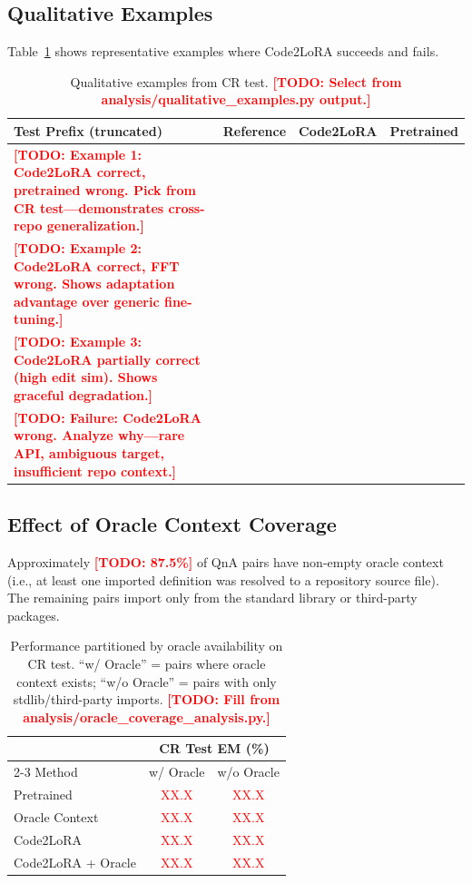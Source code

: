 \documentclass[11pt]{article}
\newcommand{\method}{Code2LoRA}
\newcommand{\todo}[1]{\textcolor{red}{\textbf{[TODO: #1]}}}
\newcommand{\todoinline}[1]{\textcolor{red}{#1}}
\begin{document}
\subsection{Qualitative Examples}

Table~\ref{tab:qualitative} shows representative examples where \method{} succeeds and fails.

\begin{table}[t]
\centering
\small
\begin{tabular}{p{5cm}p{3cm}p{3cm}p{3cm}}
\toprule
Test Prefix (truncated) & Reference & \method{} & Pretrained \\
\midrule
\todo{Example 1: Code2LoRA correct, pretrained wrong. Pick from CR test---demonstrates cross-repo generalization.} & & & \\
\midrule
\todo{Example 2: Code2LoRA correct, FFT wrong. Shows adaptation advantage over generic fine-tuning.} & & & \\
\midrule
\todo{Example 3: Code2LoRA partially correct (high edit sim). Shows graceful degradation.} & & & \\
\midrule
\todo{Failure: Code2LoRA wrong. Analyze why---rare API, ambiguous target, insufficient repo context.} & & & \\
\bottomrule
\end{tabular}
\caption{Qualitative examples from CR test. \todo{Select from analysis/qualitative\_examples.py output.}}
\label{tab:qualitative}
\end{table}

\subsection{Effect of Oracle Context Coverage}

Approximately \todo{87.5\%} of QnA pairs have non-empty oracle context (i.e., at least one imported definition was resolved to a repository source file).
The remaining pairs import only from the standard library or third-party packages.

\begin{table}[t]
\centering
\small
\begin{tabular}{lcc}
\toprule
& \multicolumn{2}{c}{CR Test EM (\%)} \\
\cmidrule(lr){2-3}
Method & w/ Oracle & w/o Oracle \\
\midrule
Pretrained & \todoinline{XX.X} & \todoinline{XX.X} \\
Oracle Context & \todoinline{XX.X} & \todoinline{XX.X} \\
\method{} & \todoinline{XX.X} & \todoinline{XX.X} \\
\method{} + Oracle & \todoinline{XX.X} & \todoinline{XX.X} \\
\bottomrule
\end{tabular}
\caption{Performance partitioned by oracle availability on CR test. ``w/ Oracle'' = pairs where oracle context exists; ``w/o Oracle'' = pairs with only stdlib/third-party imports. \todo{Fill from analysis/oracle\_coverage\_analysis.py.}}
\label{tab:oracle_coverage}
\end{table}
\end{document}
